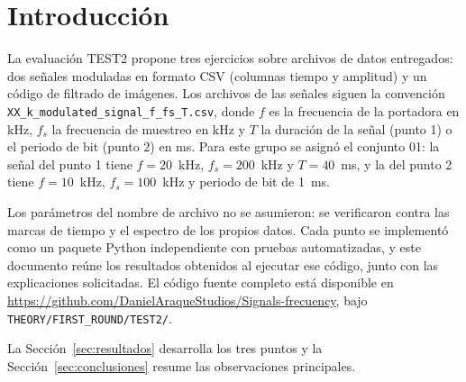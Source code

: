 
\section{Introducción}

La evaluación TEST2 propone tres ejercicios sobre archivos de datos
entregados: dos señales moduladas en formato CSV (columnas tiempo y
amplitud) y un código de filtrado de imágenes. Los archivos de las
señales siguen la convención \texttt{XX\_k\_modulated\_signal\_f\_fs\_T.csv},
donde $f$ es la frecuencia de la portadora en kHz, $f_s$ la frecuencia de
muestreo en kHz y $T$ la duración de la señal (punto 1) o el periodo de
bit (punto 2) en ms. Para este grupo se asignó el conjunto 01: la señal
del punto 1 tiene $f=20$~kHz, $f_s=200$~kHz y $T=40$~ms, y la del punto 2
tiene $f=10$~kHz, $f_s=100$~kHz y periodo de bit de 1~ms.

Los parámetros del nombre de archivo no se asumieron: se verificaron
contra las marcas de tiempo y el espectro de los propios datos. Cada punto
se implementó como un paquete Python independiente con pruebas
automatizadas, y este documento reúne los resultados obtenidos al ejecutar
ese código, junto con las explicaciones solicitadas. El código fuente
completo está disponible en
\url{https://github.com/DanielAraqueStudios/Signals-frecuency}, bajo
\texttt{THEORY/FIRST\_ROUND/TEST2/}.

La Sección~\ref{sec:resultados} desarrolla los tres puntos y la
Sección~\ref{sec:conclusiones} resume las observaciones principales.
